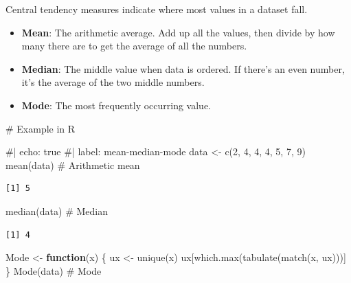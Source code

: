 \documentclass[
  man,
  floatsintext,
  longtable,
  nolmodern,
  notxfonts,
  notimes,
  colorlinks=true,linkcolor=blue,citecolor=blue,urlcolor=blue]{apa7}
\newenvironment{Shaded}{\begin{snugshade}}{\end{snugshade}}
\newcommand{\CommentTok}[1]{\textcolor[rgb]{0.37,0.37,0.37}{#1}}
\newcommand{\ControlFlowTok}[1]{\textcolor[rgb]{0.00,0.23,0.31}{\textbf{#1}}}
\newcommand{\DecValTok}[1]{\textcolor[rgb]{0.68,0.00,0.00}{#1}}
\newcommand{\FunctionTok}[1]{\textcolor[rgb]{0.28,0.35,0.67}{#1}}
\newcommand{\NormalTok}[1]{\textcolor[rgb]{0.00,0.23,0.31}{#1}}
\newcommand{\OtherTok}[1]{\textcolor[rgb]{0.00,0.23,0.31}{#1}}
\begin{document}
Central tendency measures indicate where most values in a dataset fall.

\begin{itemize}
\item
  \textbf{Mean}: The arithmetic average. Add up all the values, then
  divide by how many there are to get the average of all the numbers.
\item
  \textbf{Median}: The middle value when data is ordered. If there's an
  even number, it's the average of the two middle numbers.
\item
  \textbf{Mode}: The most frequently occurring value.
\end{itemize}

\begin{Shaded}
\begin{Highlighting}[]
\CommentTok{\# Example in R}

\CommentTok{\#| echo: true}
\CommentTok{\#| label: mean{-}median{-}mode}
\NormalTok{data }\OtherTok{\textless{}{-}} \FunctionTok{c}\NormalTok{(}\DecValTok{2}\NormalTok{, }\DecValTok{4}\NormalTok{, }\DecValTok{4}\NormalTok{, }\DecValTok{4}\NormalTok{, }\DecValTok{5}\NormalTok{, }\DecValTok{7}\NormalTok{, }\DecValTok{9}\NormalTok{)}
\FunctionTok{mean}\NormalTok{(data)   }\CommentTok{\# Arithmetic mean}
\end{Highlighting}
\end{Shaded}

\begin{verbatim}
[1] 5
\end{verbatim}

\begin{Shaded}
\begin{Highlighting}[]
\FunctionTok{median}\NormalTok{(data) }\CommentTok{\# Median}
\end{Highlighting}
\end{Shaded}

\begin{verbatim}
[1] 4
\end{verbatim}

\begin{Shaded}
\begin{Highlighting}[]
\NormalTok{Mode }\OtherTok{\textless{}{-}} \ControlFlowTok{function}\NormalTok{(x) \{}
\NormalTok{  ux }\OtherTok{\textless{}{-}} \FunctionTok{unique}\NormalTok{(x)}
\NormalTok{  ux[}\FunctionTok{which.max}\NormalTok{(}\FunctionTok{tabulate}\NormalTok{(}\FunctionTok{match}\NormalTok{(x, ux)))]}
\NormalTok{\}}
\FunctionTok{Mode}\NormalTok{(data)   }\CommentTok{\# Mode}
\end{Highlighting}
\end{Shaded}
\end{document}
